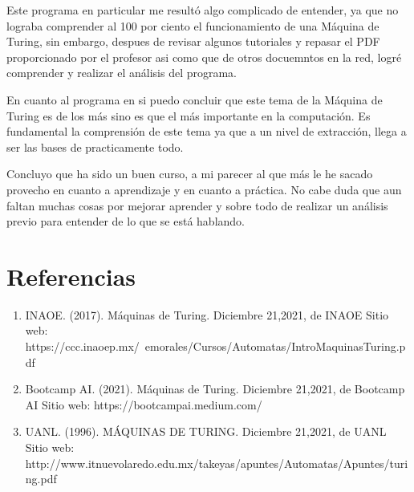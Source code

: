 \documentclass{article}
\begin{document}
	Este programa en particular me resultó algo complicado de entender, ya que no lograba comprender al 100 por ciento el funcionamiento de una Máquina de Turing, sin embargo, despues de revisar algunos tutoriales y repasar el PDF proporcionado por el profesor asi como que de otros docuemntos en la red,  logré comprender y realizar el análisis del programa. 
	
	En cuanto al programa en si puedo concluir que este tema de la Máquina de Turing es de los más sino es que el más importante en la computación. Es fundamental la comprensión de este tema ya que a un nivel de extracción, llega a ser las bases de practicamente todo.
	
	Concluyo que ha sido un buen curso, a mi parecer al que más le he sacado provecho en cuanto a aprendizaje y en cuanto a práctica. No cabe duda que aun faltan muchas cosas por mejorar aprender y sobre todo de realizar un análisis previo para entender de lo que se está hablando.
	
	
	\section*{Referencias}
	\begin{enumerate}
		\item INAOE. (2017). Máquinas de Turing. Diciembre 21,2021, de INAOE Sitio web: https://ccc.inaoep.mx/~emorales/Cursos/Automatas/IntroMaquinasTuring.pdf
		\item Bootcamp AI. (2021). Máquinas de Turing. Diciembre 21,2021, de Bootcamp AI Sitio web: https://bootcampai.medium.com/
		\item UANL. (1996). MÁQUINAS DE TURING. Diciembre 21,2021, de UANL Sitio web: http://www.itnuevolaredo.edu.mx/takeyas/apuntes/Automatas/Apuntes/turing.pdf
	\end{enumerate}
\end{document}
